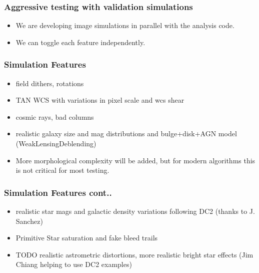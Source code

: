 \documentclass{beamer}
\begin{document}
\frame
{

    \frametitle{Aggressive testing with validation simulations}

    \begin{itemize}

        \item We are developing image simulations in parallel with the analysis code.
        \item We can toggle each feature independently.

    \end{itemize}

}

\frame
{

    \frametitle{Simulation Features}


    \begin{itemize}

                \item field dithers, rotations
                \item TAN WCS with variations in pixel scale and wcs shear
                \item cosmic rays, bad columns
                \item realistic galaxy size and mag distributions and bulge+disk+AGN model
                  (WeakLensingDeblending)

                \item More morphological complexity will be added, but for
                    modern algorithms this is not critical for most testing.

    \end{itemize}
}

\frame
{

    \frametitle{Simulation Features cont..}


    \begin{itemize}

        \item realistic star mags and galactic density variations following DC2
            (thanks to J. Sanchez)

        \item Primitive Star saturation and fake bleed trails

        \item TODO realistic astrometric distortions, more realistic bright
            star effects (Jim Chiang helping to use DC2 examples)

    \end{itemize}
}
\end{document}
